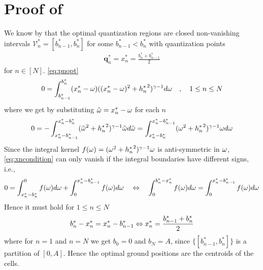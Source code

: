 \documentclass[12pt,onecolumn,final,letterpaper]{IEEEtran}
\renewcommand{\vp}{\mathbf q}
\newcommand{\Vor}{\ensuremath{\mathcal{V}}}         %
\begin{document}
\section{Proof of }\label{sec:proof_theorem} 
  We know by  that the optimal quantization regions are closed non-vanishing
  intervals $\Vor_n^*=[b_{n-1}^*,b_n^*]$ for some $b^*_{n-1}<b_n^*$ with quantization points
  \begin{align}
   \vp_n^*= x_n^*=\frac{b_n^*+b^*_{n-1}}{2}\label{eq:xnoptimal}
  \end{align}
  for $n\in[N]$.
    \eqref{eq:pnopt} %
    \begin{align}
      0 = \int^{b^*_n}_{b_{n-1}^*} (x_n^*-\omega) ((x_n^*-\omega)^2+{h^{*}_n}^2)^{\gamma-1}d\omega \quad,\quad 1\leq n\leq
      N\label{eq:vornx_diffh}
    \end{align}
    where we get by substituting ${  \tilde{\omega} }=x_n^*-\omega$ for each $n$ 
    \begin{align}
      0=-\int_{x_n^*-b^*_{n-1}}^{x^*_n-b^*_{n}} ({  \tilde{\omega} }^2+{h^{*}_n}^2)^{\gamma-1}{  \tilde{\omega} } d{  \tilde{\omega} } 
      =\int_{x_n^*-b^*_{n}}^{x_n^*-b^*_{n-1}} (\omega^2+{h^{*}_n}^2)^{\gamma-1}\omega d\omega\label{eq:xncondition}
    \end{align}
    Since the integral kernel $f(\omega)=(\omega^2+{h^{*}_n}^2)^{\gamma-1}\omega$ is  anti-symmetric in $\omega$,
    \eqref{eq:xncondition} can only vanish if the integral boundaries have different signs, i.e.,
    \begin{align}
      0= \int_{x_n^*-b_{n}^*}^0 f(\omega)d\omega + \int_0^{x_n^*-b_{n-1}^*} f(\omega)d\omega 
      \quad    \Leftrightarrow \quad
          \int_0^{b^*_n-x_n^*} f(\omega)d\omega = \int_0^{x_n^*-b^*_{n-1}}f(\omega)d\omega 
          \notag
    \end{align}
    Hence it must hold  for $1\leq n\leq N$
    \begin{align}
      b^*_{n} -{x^{*}_n}={x^{*}_n}-b^*_{n-1} \Leftrightarrow  {\ensuremath{x^{*}}_n}=\frac{b_{n-1}^*+b_{n}^*}{2}\label{eq:bnoptimal}
    \end{align}
    where for $n=1$ and $n=N$ we get $b_0=0$ and $b_N=A$, since $\{[b^*_{n-1},b_n^*]\}$ is a partition of $[0,A]$. Hence
    the optimal ground positions are the centroids of the cells. 
  \fi
\end{document}
